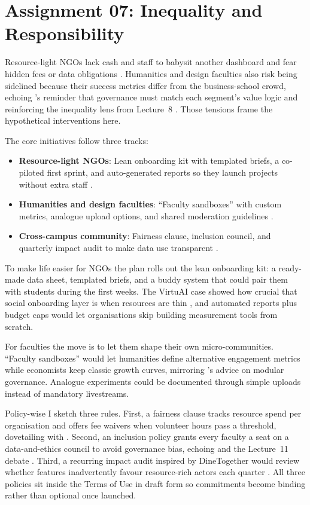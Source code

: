 \section*{Assignment 07: Inequality and Responsibility}

Resource-light NGOs lack cash and staff to babysit another dashboard and fear hidden fees or data obligations \citep{Srnicek2017}. Humanities and design faculties also risk being sidelined because their success metrics differ from the business-school crowd, echoing \citet{Choudary2016}'s reminder that governance must match each segment’s value logic and reinforcing the inequality lens from Lecture~8 \citep{Lecture08}. Those tensions frame the hypothetical interventions here.

The core initiatives follow three tracks:
\begin{itemize}
  \item \textbf{Resource-light NGOs}: Lean onboarding kit with templated briefs, a co-piloted first sprint, and auto-generated reports so they launch projects without extra staff \citep{Gunasilan2024}.
  \item \textbf{Humanities and design faculties}: ``Faculty sandboxes'' with custom metrics, analogue upload options, and shared moderation guidelines \citep{Reillier2017}.
  \item \textbf{Cross-campus community}: Fairness clause, inclusion council, and quarterly impact audit to make data use transparent \citep{ShapiroVarian1999,Rennella2023}.
\end{itemize}

To make life easier for NGOs the plan rolls out the lean onboarding kit: a ready-made data sheet, templated briefs, and a buddy system that could pair them with students during the first weeks. The VirtuAI case showed how crucial that social onboarding layer is when resources are thin \citep{Gunasilan2024}, and automated reports plus budget caps would let organisations skip building measurement tools from scratch.

For faculties the move is to let them shape their own micro-communities. ``Faculty sandboxes'' would let humanities define alternative engagement metrics while economists keep classic growth curves, mirroring \citet{Reillier2017}'s advice on modular governance. Analogue experiments could be documented through simple uploads instead of mandatory livestreams.

Policy-wise I sketch three rules. First, a fairness clause tracks resource spend per organisation and offers fee waivers when volunteer hours pass a threshold, dovetailing with \citet{ShapiroVarian1999}. Second, an inclusion policy grants every faculty a seat on a data-and-ethics council to avoid governance bias, echoing \citet{Zuboff2019} and the Lecture~11 debate \citep{Lecture11}. Third, a recurring impact audit inspired by DineTogether would review whether features inadvertently favour resource-rich actors each quarter \citep{Rennella2023}. All three policies sit inside the Terms of Use in draft form so commitments become binding rather than optional once launched.

